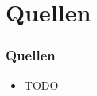 \section{Quellen}
\begin{frame}
    \frametitle{Quellen}
    \begin{itemize}
        \item TODO
    \end{itemize}
\end{frame}

